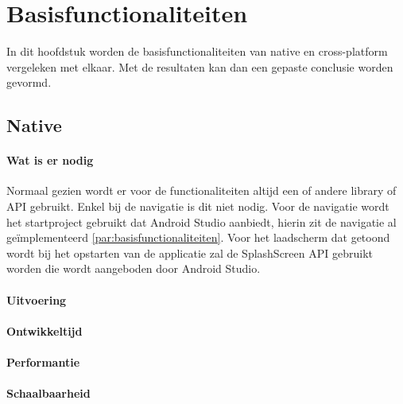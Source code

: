 
\chapter{Basisfunctionaliteiten}%
\label{ch:basisfunctionaliteiten}

In dit hoofdstuk worden de basisfunctionaliteiten van native en cross-platform vergeleken met elkaar. 
Met de resultaten kan dan een gepaste conclusie worden gevormd.

\section{Native}
\subsubsection{Wat is er nodig}
Normaal gezien wordt er voor de functionaliteiten altijd een of andere library of API gebruikt. 
Enkel bij de navigatie is dit niet nodig. Voor de navigatie wordt het 
startproject gebruikt dat Android Studio aanbiedt, hierin zit de navigatie al geïmplementeerd 
\ref{par:basisfunctionaliteiten}. Voor het laadscherm dat getoond wordt bij het opstarten van 
de applicatie zal de SplashScreen API gebruikt worden die wordt aangeboden door Android Studio.

\subsubsection{Uitvoering}



\subsubsection{Ontwikkeltijd}



\subsubsection{Performantie}



\subsubsection{Schaalbaarheid}

